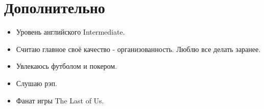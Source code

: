 \section*{Дополнительно}
\vspace{-\topsep}
\begin{itemize}[left=1em] 
    \item Уровень английского Intermediate.
    \item Считаю главное своё качество - организованность. Люблю все делать заранее.
    \item Увлекаюсь футболом и покером.
    \item Слушаю рэп.
    \item Фанат игры The Last of Us.
\end{itemize}

